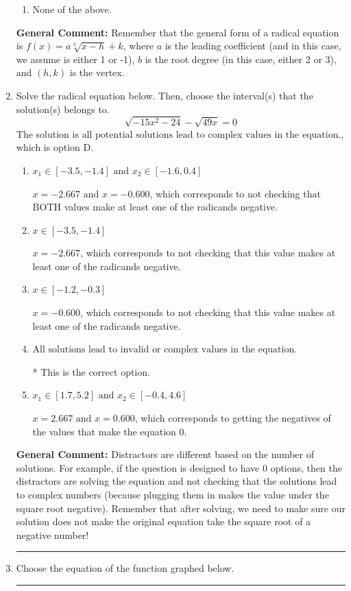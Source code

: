 \documentclass{extbook}[14pt]
\newcommand{\litem}[1]{\item #1

\rule{\textwidth}{0.4pt}}
\begin{document}
\begin{enumerate}
{\begin{enumerate}[label=\Alph*.]
\item None of the above.\end{enumerate}
\textbf{General Comment:} Remember that the general form of a radical equation is $ f(x) = a \sqrt[b]{x - h} + k $, where $a$ is the leading coefficient (and in this case, we assume is either 1 or -1), $b$ is the root degree (in this case, either 2 or 3), and $(h, k)$ is the vertex.
}
\litem{
Solve the radical equation below. Then, choose the interval(s) that the solution(s) belongs to.
\[ \sqrt{-15 x^2 - 24} - \sqrt{49 x} = 0 \]The solution is \( \text{all potential solutions lead to complex values in the equation.} \), which is option D.\begin{enumerate}[label=\Alph*.]
\item \( x_1 \in [-3.5, -1.4] \text{ and } x_2 \in [-1.6,0.4] \)

$x = -2.667 \text{ and } x = -0.600$, which corresponds to not checking that BOTH values make at least one of the radicands negative.
\item \( x \in [-3.5,-1.4] \)

$x = -2.667$, which corresponds to not checking that this value makes at least one of the radicands negative.
\item \( x \in [-1.2,-0.3] \)

$x = -0.600$, which corresponds to not checking that this value makes at least one of the radicands negative.
\item \( \text{All solutions lead to invalid or complex values in the equation.} \)

* This is the correct option.
\item \( x_1 \in [1.7, 5.2] \text{ and } x_2 \in [-0.4,4.6] \)

$x = 2.667 \text{ and } x = 0.600$, which corresponds to getting the negatives of the values that make the equation 0.
\end{enumerate}

\textbf{General Comment:} Distractors are different based on the number of solutions. For example, if the question is designed to have 0 options, then the distractors are solving the equation and not checking that the solutions lead to complex numbers (because plugging them in makes the value under the square root negative). Remember that after solving, we need to make sure our solution does not make the original equation take the square root of a negative number!
}
\litem{
Choose the equation of the function graphed below.

}
\end{enumerate}
\end{document}
